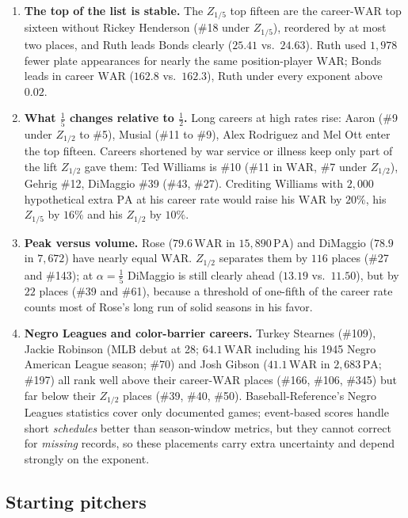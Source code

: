 \documentclass[11pt,letterpaper]{article}
\theoremstyle{plain}
\theoremstyle{definition}
\theoremstyle{remark}
\newcommand{\WAR}{\mathrm{WAR}}
\newcommand{\PA}{\mathrm{PA}}
\begin{document}
\begin{enumerate}
    \item \textbf{The top of the list is stable.} The $Z_{1/5}$ top fifteen are the career-$\WAR$ top sixteen without Rickey Henderson (\#18 under $Z_{1/5}$), reordered by at most two places, and Ruth leads Bonds clearly ($25.41$ vs.\ $24.63$). Ruth used $1{,}978$ fewer plate appearances for nearly the same position-player $\WAR$; Bonds leads in career $\WAR$ ($162.8$ vs.\ $162.3$), Ruth under every exponent above $0.02$.
    \item \textbf{What $\tfrac15$ changes relative to $\tfrac12$.} Long careers at high rates rise: Aaron (\#9 under $Z_{1/2}$ to \#5), Musial (\#11 to \#9), Alex Rodriguez and Mel Ott enter the top fifteen. Careers shortened by war service or illness keep only part of the lift $Z_{1/2}$ gave them: Ted Williams is \#10 (\#11 in $\WAR$, \#7 under $Z_{1/2}$), Gehrig \#12, DiMaggio \#39 (\#43, \#27). Crediting Williams with $2{,}000$ hypothetical extra $\PA$ at his career rate would raise his $\WAR$ by $20\%$, his $Z_{1/5}$ by $16\%$ and his $Z_{1/2}$ by $10\%$.
    \item \textbf{Peak versus volume.} Rose ($79.6\,\WAR$ in $15{,}890\,\PA$) and DiMaggio ($78.9$ in $7{,}672$) have nearly equal $\WAR$. $Z_{1/2}$ separates them by $116$ places (\#27 and \#143); at $\alpha = \tfrac15$ DiMaggio is still clearly ahead ($13.19$ vs.\ $11.50$), but by $22$ places (\#39 and \#61), because a threshold of one-fifth of the career rate counts most of Rose's long run of solid seasons in his favor.
    \item \textbf{Negro Leagues and color-barrier careers.} Turkey Stearnes (\#109), Jackie Robinson (MLB debut at 28; $64.1\,\WAR$ including his 1945 Negro American League season; \#70) and Josh Gibson ($41.1\,\WAR$ in $2{,}683\,\PA$; \#197) all rank well above their career-$\WAR$ places (\#166, \#106, \#345) but far below their $Z_{1/2}$ places (\#39, \#40, \#50). Baseball-Reference's Negro Leagues statistics cover only documented games; event-based scores handle short \emph{schedules} better than season-window metrics, but they cannot correct for \emph{missing} records, so these placements carry extra uncertainty and depend strongly on the exponent.
\end{enumerate}

\subsection{Starting pitchers}
\label{sec:pitchers}
\end{document}
